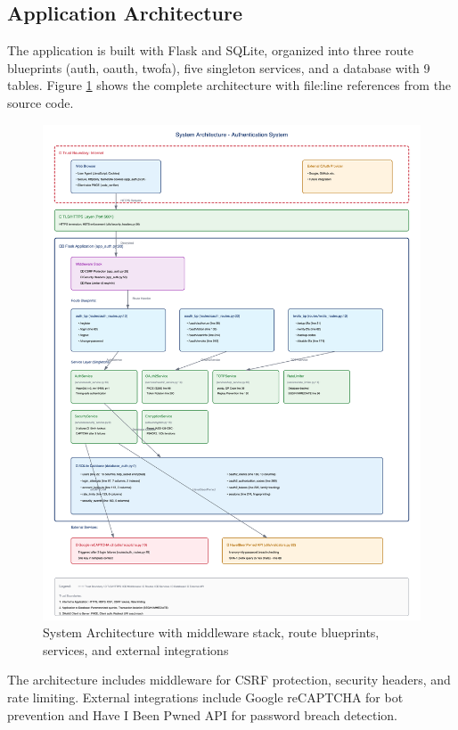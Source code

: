 \documentclass[12pt,a4paper]{article}
\begin{document}
\subsection{Application Architecture}

The application is built with Flask and SQLite, organized into three route blueprints (auth, oauth, twofa), five singleton services, and a database with 9 tables. Figure \ref{fig:architecture} shows the complete architecture with file:line references from the source code.

\begin{figure}[H]
    \centering
    \includegraphics[width=\textwidth]{diagrams/1_system_architecture.png}
    \caption{System Architecture with middleware stack, route blueprints, services, and external integrations}
    \label{fig:architecture}
\end{figure}

The architecture includes middleware for CSRF protection, security headers, and rate limiting. External integrations include Google reCAPTCHA for bot prevention and Have I Been Pwned API for password breach detection.
\end{document}
